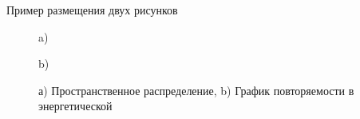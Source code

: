 Пример размещения двух рисунков
\begin{figure}[ht!]
\begin{minipage}
[b]{0.47\linewidth}
 a) \\
\end{minipage}
\hfill
\begin{minipage}[b]{0.5\linewidth}
 b) \\
\end{minipage}
\caption{а) Пространственное распределение, b) График повторяемости в энергетической}\label{fig:RC2}
\end{figure}

